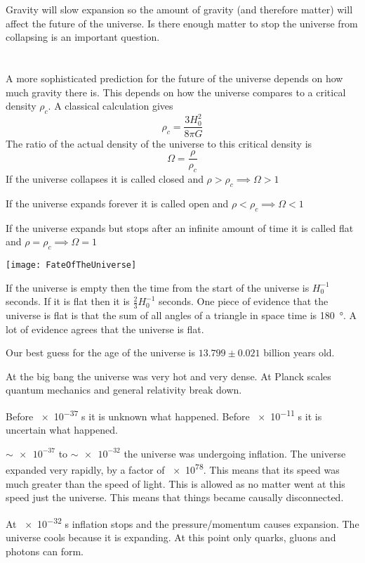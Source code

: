 Gravity will slow expansion so the amount of gravity (and therefore matter) will affect the future of the universe. Is there enough matter to stop the universe from collapsing is an important question.

\section{}

A more sophisticated prediction for the future of the universe depends on how much gravity there is. This depends on how the universe compares to a critical density \(\rho_c\). A classical calculation gives
\[\rho_c=\frac{3H_0^2}{8\pi G}\]
The ratio of the actual density of the universe to this critical density is
\[\Omega=\frac{\rho}{\rho_c}\]
If the universe collapses it is called closed and \(\rho>\rho_c\implies\Omega>1\)

If the universe expands forever it is called open and \(\rho<\rho_c\implies\Omega<1\)

If the universe expands but stops after an infinite amount of time it is called flat and \(\rho=\rho_c\implies\Omega=1\)

\begin{center}
\texttt{[image: FateOfTheUniverse]}
\end{center}

If the universe is empty then the time from the start of the universe is \(H_0^{-1}\) seconds. If it is flat then it is \(\frac 23 H_0^{-1}\) seconds. One piece of evidence that the universe is flat is that the sum of all angles of a triangle in space time is \SI{180}{\degree}. A lot of evidence agrees that the universe is flat.

Our best guess for the age of the universe is \(13.799\pm0.021\) billion years old.

At the big bang the universe was very hot and very dense. At Planck scales quantum mechanics and general relativity break down. 

Before \num{e-37} \si{s} it is unknown what happened. Before \num{e-11} \si{s} it is uncertain what happened.

\(\sim\num{e-37}\) to \(\sim\num{e-32}\) the universe was undergoing inflation. The universe expanded very rapidly, by a factor of \num{e78}. This means that its speed was much greater than the speed of light. This is allowed as no matter went at this speed just the universe. This means that things became causally disconnected.

At \num{e-32} \si{s} inflation stops and the pressure/momentum causes expansion. The universe cools because it is expanding. At this point only quarks, gluons and photons can form.

